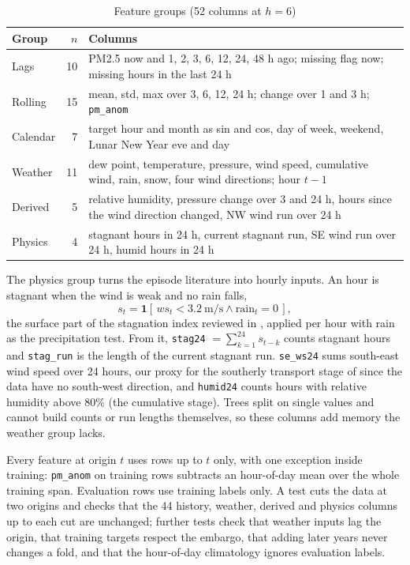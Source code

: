 \documentclass[conference]{IEEEtran}
\newcommand{\col}[1]{\texttt{#1}}
\begin{document}
\begin{table}[!htb]
\centering
\caption{Feature groups (52 columns at $h = 6$)}
\label{tab:features}
\begin{tabular}{@{}lrp{}@{}}
\toprule
Group & $n$ & Columns \\
\midrule
Lags & 10 & PM2.5 now and 1, 2, 3, 6, 12, 24, 48 h ago; missing flag now; missing hours in the last 24 h \\
Rolling & 15 & mean, std, max over 3, 6, 12, 24 h; change over 1 and 3 h; \col{pm\_anom} \\
Calendar & 7 & target hour and month as sin and cos, day of week, weekend, Lunar New Year eve and day \\
Weather & 11 & dew point, temperature, pressure, wind speed, cumulative wind, rain, snow, four wind directions; hour $t-1$ \\
Derived & 5 & relative humidity, pressure change over 3 and 24 h, hours since the wind direction changed, NW wind run over 24 h \\
Physics & 4 & stagnant hours in 24 h, current stagnant run, SE wind run over 24 h, humid hours in 24 h \\
\bottomrule
\end{tabular}
\end{table}

The physics group turns the episode literature into hourly inputs. An hour is stagnant when the wind is weak and no rain falls,
\begin{equation}
s_t = \mathbf{1}[\,ws_t < 3.2\ \text{m/s} \wedge \text{rain}_t = 0\,],
\end{equation}
the surface part of the stagnation index reviewed in \cite{huang2018}, applied per hour with rain as the precipitation test. From it, \col{stag24} $= \sum_{k=1}^{24} s_{t-k}$ counts stagnant hours and \col{stag\_run} is the length of the current stagnant run. \col{se\_ws24} sums south-east wind speed over 24 hours, our proxy for the southerly transport stage of \cite{zhong2018} since the data have no south-west direction, and \col{humid24} counts hours with relative humidity above 80\% (the cumulative stage). Trees split on single values and cannot build counts or run lengths themselves, so these columns add memory the weather group lacks.

Every feature at origin $t$ uses rows up to $t$ only, with one exception inside training: \col{pm\_anom} on training rows subtracts an hour-of-day mean over the whole training span. Evaluation rows use training labels only. A test cuts the data at two origins and checks that the 44 history, weather, derived and physics columns up to each cut are unchanged; further tests check that weather inputs lag the origin, that training targets respect the embargo, that adding later years never changes a fold, and that the hour-of-day climatology ignores evaluation labels.
\end{document}
